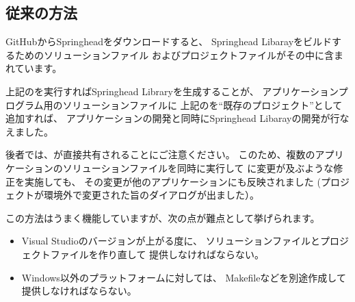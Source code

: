 
\subsection{従来の方法}
\label{subsec:WhatCMakeWillDoConventionalMethod}

\noindent
GitHubからSpringheadをダウンロードすると、
Springhead Libarayをビルドするためのソリューションファイル
およびプロジェクトファイルがその中に含まれています。

\medskip
\begin{narrow}
    \begin{narrow}\begin{minipage}{\textwidth}
	\medskip
  \end{minipage}\end{narrow}
\end{narrow}

上記の\SolutionFile を実行すればSpringhead Libraryを生成することが、
アプリケーションプログラム用のソリューションファイルに
上記の\ProjectFile を``既存のプロジェクト''として追加すれば、
アプリケーションの開発と同時にSpringhead Libarayの開発が行なえました。

後者では、\ProjectFile が直接共有されることにご注意ください。
このため、複数のアプリケーションのソリューションファイルを同時に実行して
\ProjectFile に変更が及ぶような修正を実施しても、
その変更が他のアプリケーションにも反映されました
(プロジェクトが環境外で変更された旨のダイアログが出ました）。

\medskip
この方法はうまく機能していますが、次の点が難点として挙げられます。
\begin{itemize}
  \item	Visual Studioのバージョンが上がる度に、
	ソリューションファイルとプロジェクトファイルを作り直して
	提供しなければならない。
  \item	Windows以外のプラットフォームに対しては、
	Makefileなどを別途作成して提供しなければならない。
\end{itemize}

